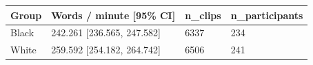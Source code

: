 \begin{tabular}{llll}
\toprule
Group & Words / minute [95\% CI] & n\_clips & n\_participants \\
\midrule
Black & 242.261 [236.565, 247.582] & 6337 & 234 \\
White & 259.592 [254.182, 264.742] & 6506 & 241 \\
\bottomrule
\end{tabular}
